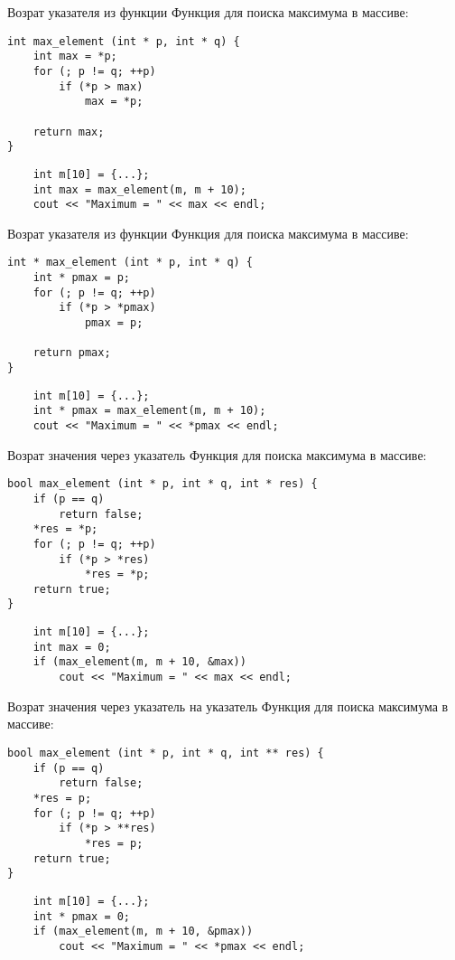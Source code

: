 \documentclass{beamer}
\begin{document}
\begin{frame}[fragile]{Возрат указателя из функции}
Функция для поиска максимума в массиве:
\begin{lstlisting}
int max_element (int * p, int * q) {
    int max = *p;
    for (; p != q; ++p)
        if (*p > max)
            max = *p;

    return max;
}
\end{lstlisting}
\begin{lstlisting}
    int m[10] = {...};
    int max = max_element(m, m + 10); 
    cout << "Maximum = " << max << endl; 
\end{lstlisting}
\end{frame}

\begin{frame}[fragile]{Возрат указателя из функции}
Функция для поиска максимума в массиве:
\begin{lstlisting}
int * max_element (int * p, int * q) {
    int * pmax = p;
    for (; p != q; ++p)
        if (*p > *pmax)
            pmax = p;

    return pmax;
}
\end{lstlisting}
\begin{lstlisting}
    int m[10] = {...};
    int * pmax = max_element(m, m + 10); 
    cout << "Maximum = " << *pmax << endl; 
\end{lstlisting}
\end{frame}

\begin{frame}[fragile]{Возрат значения через указатель}
Функция для поиска максимума в массиве:
\begin{lstlisting}
bool max_element (int * p, int * q, int * res) {
    if (p == q)
        return false;
    *res = *p;
    for (; p != q; ++p)
        if (*p > *res)
            *res = *p;
    return true;
}
\end{lstlisting}
\begin{lstlisting}
    int m[10] = {...};
    int max = 0;
    if (max_element(m, m + 10, &max)) 
        cout << "Maximum = " << max << endl; 
\end{lstlisting}
\end{frame}

\begin{frame}[fragile]{Возрат значения через указатель на указатель}
Функция для поиска максимума в массиве:
\begin{lstlisting}
bool max_element (int * p, int * q, int ** res) {
    if (p == q)
        return false;
    *res = p;
    for (; p != q; ++p)
        if (*p > **res)
            *res = p;
    return true;
}
\end{lstlisting}
\begin{lstlisting}
    int m[10] = {...};
    int * pmax = 0;
    if (max_element(m, m + 10, &pmax)) 
        cout << "Maximum = " << *pmax << endl; 
\end{lstlisting}
\end{frame}
\end{document}

